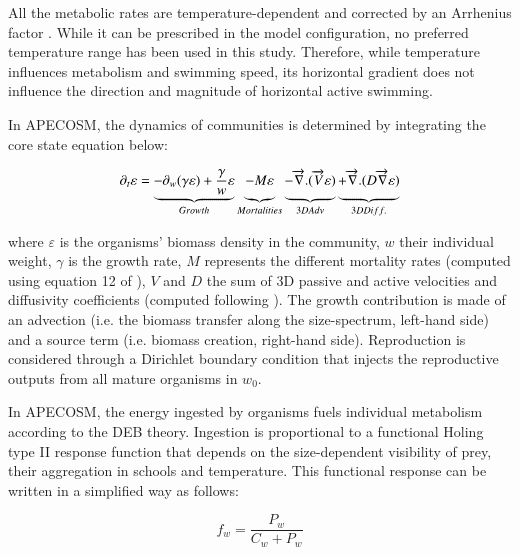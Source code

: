 All the metabolic rates are temperature-dependent and corrected by an Arrhenius factor \citep{mauryModelingEnvironmentalEffects2007, mauryIndividualsPopulationsCommunities2013}. While it can be prescribed in the model configuration, no preferred temperature range has been used in this study. Therefore, while temperature influences metabolism and swimming speed, its horizontal gradient does not influence the direction and magnitude of horizontal active swimming.

In APECOSM, the dynamics of communities is determined by integrating the core state equation below:

\begin{equation}
\partial_t \varepsilon = \underbrace{- \partial_w(\gamma \varepsilon) + \frac{\gamma}{w}\varepsilon}_{Growth} 
\underbrace{- M \varepsilon \vphantom{\frac{\gamma}{w}\varepsilon}}_{Mortalities}
\underbrace{-\overrightarrow{\nabla}.(\overrightarrow{V} \varepsilon) \vphantom{\frac{\gamma}{w}\varepsilon}}_{3D Adv} 
\underbrace{+ \overrightarrow{\nabla} . (D \overrightarrow{\nabla} \varepsilon) \vphantom{\frac{\gamma}{w}\varepsilon}}_{3D Diff.}
\label{eq:apecosm_trend}
\end{equation}

where $\varepsilon$  is the organisms' biomass density in the community, $w$ their individual weight, $\gamma$ is the growth rate, $M$ represents the different mortality rates (computed using equation 12 of \citealt{mauryIndividualsPopulationsCommunities2013}), $V$ and $D$ the sum of 3D passive and active velocities and diffusivity coefficients (computed following \citealt{faugerasAdvectiondiffusionreactionSizestructuredFish2005}). The growth contribution is made of an advection (i.e. the biomass transfer along the size-spectrum, left-hand side) and a source term (i.e. biomass creation, right-hand side). Reproduction is considered through a Dirichlet boundary condition that injects the reproductive outputs from all mature organisms in $w_0$.

In APECOSM, the energy ingested by organisms fuels individual metabolism according to the DEB theory. Ingestion is proportional to a functional Holing type II response function that depends on the size-dependent visibility of prey, their aggregation in schools and temperature. This functional response can be written in a simplified way as follows:

\begin{equation}
f_{w} = \frac{P_{w}}{C_{w} + P_{w}}
\label{eq:repfonct}
\end{equation}

